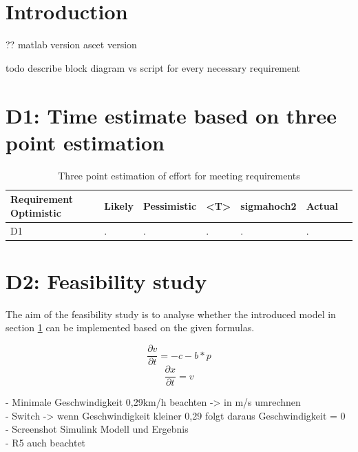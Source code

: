 
\chapter{Introduction}\label{cha:Introduction}
??
matlab version
ascet version

todo describe block diagram vs script for every necessary requirement
\chapter{D1: Time estimate based on three point estimation}\label{cha:D1}
\begin{table}[H]
\centering
\caption{Three point estimation of effort for meeting requirements}
\begin{adjustbox}{width=1\textwidth, center=\textwidth}
\renewcommand{\arraystretch}{1}
\begin{tabular}{lllllll}
\textbf{Requirement} \textbf{Optimistic} & \textbf{Likely} & \textbf{Pessimistic} & \textbf{<T>} & \textbf{sigmahoch2} & \textbf{Actual}\\\hline
D1 & .& .& .& .& .&\\
\end{tabular}

\end{adjustbox}
\label{tbl:ConceptTPTPProductionSymbols}
\end{table}
\chapter{D2: Feasibility study}\label{cha:D2}
The aim of the feasibility study is to analyse whether the introduced model in section \ref{cha:Introduction} can be implemented based on the given formulas. 

\begin{equation}
	\frac{\partial v}{\partial t} = -c-b*p
\end{equation}
\begin{equation}
	\frac{\partial x}{\partial t} = v
\end{equation}

- Minimale Geschwindigkeit 0,29km/h beachten -> in m/s umrechnen \\
- Switch -> wenn Geschwindigkeit kleiner 0,29 folgt daraus Geschwindigkeit = 0 \\
- Screenshot Simulink Modell und Ergebnis\\
- R5 auch beachtet \\


